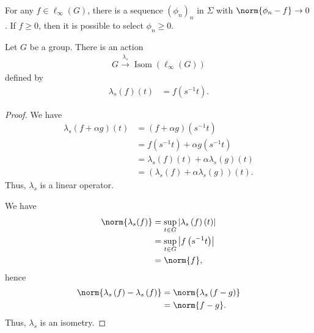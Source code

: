 \documentclass[10pt]{mypackage}
\begin{document}
\begin{corollary}
  For any $f\in \ell_{\infty}(G)$, there is a sequence $\left(\phi_n\right)_n$ in $\Sigma$ with $\norm{\phi_n - f} \rightarrow 0$. If $f \geq 0$, then it is possible to select $\phi_n \geq 0$.
\end{corollary}
\begin{proposition}
  Let $G$ be a group. There is an action
  \begin{align*}
    G \xrightarrow{\lambda_s} \operatorname{Isom}\left(\ell_{\infty}(G)\right)
  \end{align*}
  defined by
  \begin{align*}
    \lambda_{s}\left(f\right)\left(t\right) &= f\left(s^{-1}t\right).
  \end{align*}
\end{proposition}
\begin{proof}
  We have
  \begin{align*}
    \lambda_{s}\left(f + \alpha g\right)\left(t\right) &= \left(f + \alpha g\right)\left(s^{-1}t\right)\\
                                                       &= f\left(s^{-1}t\right) + \alpha g\left(s^{-1}t\right)\\
                                                       &= \lambda_s\left(f\right)\left(t\right) + \alpha \lambda_s\left(g\right)\left(t\right)\\
                                                       &= \left(\lambda_s\left(f\right) + \alpha \lambda_s\left(g\right)\right)\left(t\right).
  \end{align*}
  Thus, $\lambda_s$ is a linear operator.\newline

  We have
  \begin{align*}
    \norm{\lambda_s(f)} &= \sup_{t\in G}\left\vert \lambda_s\left(f\right)\left(t\right) \right\vert\\
                        &= \sup_{t\in G}\left\vert f\left(s^{-1}t\right) \right\vert\\
                        &= \norm{f},
  \end{align*}
  hence
  \begin{align*}
    \norm{\lambda_s\left(f\right) - \lambda_s\left(f\right)} &= \norm{\lambda_s\left(f-g\right)}\\
                                                             &= \norm{f-g}.
  \end{align*}
  Thus, $\lambda_s$ is an isometry.\newline


\end{proof}
\end{document}
